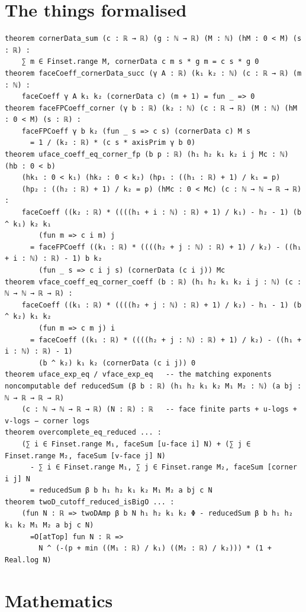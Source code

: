 \documentclass[11pt]{article}
\begin{document}
\section{The things formalised}
{\small
\begin{verbatim}
theorem cornerData_sum (c : ℝ → ℝ) (g : ℕ → ℝ) (M : ℕ) (hM : 0 < M) (s : ℝ) :
    ∑ m ∈ Finset.range M, cornerData c m s * g m = c s * g 0
theorem faceCoeff_cornerData_succ (γ A : ℝ) (k₁ k₂ : ℕ) (c : ℝ → ℝ) (m : ℕ) :
    faceCoeff γ A k₁ k₂ (cornerData c) (m + 1) = fun _ => 0
theorem faceFPCoeff_corner (γ b : ℝ) (k₂ : ℕ) (c : ℝ → ℝ) (M : ℕ) (hM : 0 < M) (s : ℝ) :
    faceFPCoeff γ b k₂ (fun _ s => c s) (cornerData c) M s
      = 1 / (k₂ : ℝ) * (c s * axisPrim γ b 0)
theorem uface_coeff_eq_corner_fp (b p : ℝ) (h₁ h₂ k₁ k₂ i j Mc : ℕ) (hb : 0 < b)
    (hk₁ : 0 < k₁) (hk₂ : 0 < k₂) (hp₁ : ((h₁ : ℝ) + 1) / k₁ = p)
    (hp₂ : ((h₂ : ℝ) + 1) / k₂ = p) (hMc : 0 < Mc) (c : ℕ → ℕ → ℝ → ℝ) :
    faceCoeff ((k₂ : ℝ) * ((((h₁ + i : ℕ) : ℝ) + 1) / k₁) - h₂ - 1) (b ^ k₁) k₂ k₁
        (fun m => c i m) j
      = faceFPCoeff ((k₁ : ℝ) * ((((h₂ + j : ℕ) : ℝ) + 1) / k₂) - ((h₁ + i : ℕ) : ℝ) - 1) b k₂
        (fun _ s => c i j s) (cornerData (c i j)) Mc
theorem vface_coeff_eq_corner_coeff (b : ℝ) (h₁ h₂ k₁ k₂ i j : ℕ) (c : ℕ → ℕ → ℝ → ℝ) :
    faceCoeff ((k₁ : ℝ) * ((((h₂ + j : ℕ) : ℝ) + 1) / k₂) - h₁ - 1) (b ^ k₂) k₁ k₂
        (fun m => c m j) i
      = faceCoeff ((k₁ : ℝ) * ((((h₂ + j : ℕ) : ℝ) + 1) / k₂) - ((h₁ + i : ℕ) : ℝ) - 1)
        (b ^ k₂) k₁ k₂ (cornerData (c i j)) 0
theorem uface_exp_eq / vface_exp_eq   -- the matching exponents
noncomputable def reducedSum (β b : ℝ) (h₁ h₂ k₁ k₂ M₁ M₂ : ℕ) (a bj : ℕ → ℝ → ℝ → ℝ)
    (c : ℕ → ℕ → ℝ → ℝ) (N : ℝ) : ℝ   -- face finite parts + u-logs + v-logs − corner logs
theorem overcomplete_eq_reduced ... :
    (∑ i ∈ Finset.range M₁, faceSum [u-face i] N) + (∑ j ∈ Finset.range M₂, faceSum [v-face j] N)
      - ∑ i ∈ Finset.range M₁, ∑ j ∈ Finset.range M₂, faceSum [corner i j] N
      = reducedSum β b h₁ h₂ k₁ k₂ M₁ M₂ a bj c N
theorem twoD_cutoff_reduced_isBigO ... :
    (fun N : ℝ => twoDAmp β b N h₁ h₂ k₁ k₂ Φ - reducedSum β b h₁ h₂ k₁ k₂ M₁ M₂ a bj c N)
      =O[atTop] fun N : ℝ =>
        N ^ (-(p + min ((M₁ : ℝ) / k₁) ((M₂ : ℝ) / k₂))) * (1 + Real.log N)
\end{verbatim}
}

\section{Mathematics}
\end{document}
